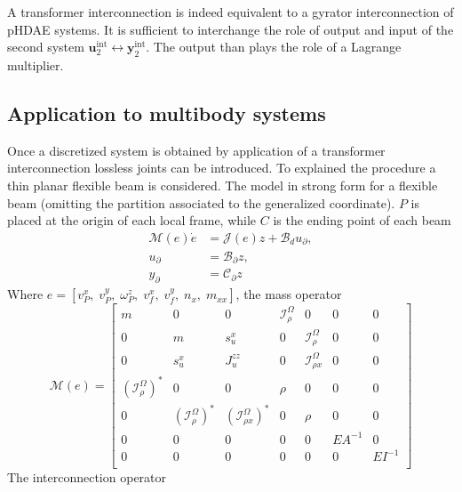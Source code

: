 A transformer interconnection is indeed equivalent to a gyrator interconnection of pHDAE systems.
It is sufficient to interchange the role of output and input of the second system $\bm{u}_2^{\text{int}} \leftrightarrow \bm{y}_2^{\text{int}}$. The output than plays the role of a Lagrange multiplier.


\subsection{Application to multibody systems}
Once a discretized system is obtained by application of a transformer interconnection lossless joints can be introduced. To explained the procedure a thin planar flexible beam is considered.  
The model in strong form for a flexible beam (omitting the partition associated to the generalized coordinate). $P$ is placed at the origin of each local frame, while $C$ is the ending point of each beam
\begin{equation}
\label{eq:EB_str_phdae}
\begin{aligned}
\mathcal{M}(e) \dot{e} &= \mathcal{J}(e) z + \mathcal{B}_d u_\partial, \\
u_\partial &= \mathcal{B}_{\partial} z , \\
y_\partial &= \mathcal{C}_{\partial} z
\end{aligned}
\end{equation}
Where $e = [v_P^x, \; v_P^y, \; \omega_P^z, \; v_f^x, \; v_f^y, \; n_x, \; m_{xx}]$, the mass operator
\begin{equation}
\label{eq:EB_M}
\mathcal{M}(e) = 
\begin{bmatrix}
m & 0 & 0 & \mathcal{I}_\rho^{\Omega} & 0 & 0 & 0 \\
0 & m & s_u^x & 0 & \mathcal{I}_\rho^{\Omega} & 0 & 0 \\
0 & s_u^x & J_u^{zz} & 0 & \mathcal{I}_{\rho x}^{\Omega} & 0 & 0 \\
(\mathcal{I}_\rho^{\Omega})^* & 0 & 0 & \rho & 0 & 0 & 0  \\
0 & (\mathcal{I}_\rho^{\Omega})^* & (\mathcal{I}_{\rho x}^{\Omega})^* & 0 & \rho & 0 & 0  \\
0 & 0 & 0 & 0 & 0 & {EA}^{-1} & 0 \\
0 & 0 & 0 & 0 & 0 & 0 & {EI}^{-1} \\
\end{bmatrix}
\end{equation}
The interconnection operator 
